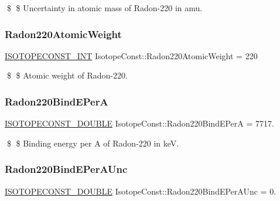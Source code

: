 \$ \$ Uncertainty in atomic mass of Radon-\/220 in amu. \mbox{\label{group___isotope_const-_radon-_rn220_ga73c3c5903616fac8aa27eb7c1c957014}} 
\subsubsection{\texorpdfstring{Radon220\+Atomic\+Weight}{Radon220AtomicWeight}}
{\footnotesize\ttfamily \mbox{\hyperlink{group___isotope_const-_macros_ga5f18360b3e99483a35c32d789e62621c}{I\+S\+O\+T\+O\+P\+E\+C\+O\+N\+S\+T\+\_\+\+I\+NT}} Isotope\+Const\+::\+Radon220\+Atomic\+Weight = 220}

\$ \$ Atomic weight of Radon-\/220. \mbox{\label{group___isotope_const-_radon-_rn220_ga349847769aebe58780b11d72389623d8}} 
\subsubsection{\texorpdfstring{Radon220\+Bind\+E\+PerA}{Radon220BindEPerA}}
{\footnotesize\ttfamily \mbox{\hyperlink{group___isotope_const-_macros_ga8f45a7272ce02c0b4c65c44636ed719a}{I\+S\+O\+T\+O\+P\+E\+C\+O\+N\+S\+T\+\_\+\+D\+O\+U\+B\+LE}} Isotope\+Const\+::\+Radon220\+Bind\+E\+PerA = 7717.}

\$ \$ Binding energy per A of Radon-\/220 in keV. \mbox{\label{group___isotope_const-_radon-_rn220_ga964f45f2c21ea4b165eaab1e4d8087c6}} 
\subsubsection{\texorpdfstring{Radon220\+Bind\+E\+Per\+A\+Unc}{Radon220BindEPerAUnc}}
{\footnotesize\ttfamily \mbox{\hyperlink{group___isotope_const-_macros_ga8f45a7272ce02c0b4c65c44636ed719a}{I\+S\+O\+T\+O\+P\+E\+C\+O\+N\+S\+T\+\_\+\+D\+O\+U\+B\+LE}} Isotope\+Const\+::\+Radon220\+Bind\+E\+Per\+A\+Unc = 0.}

